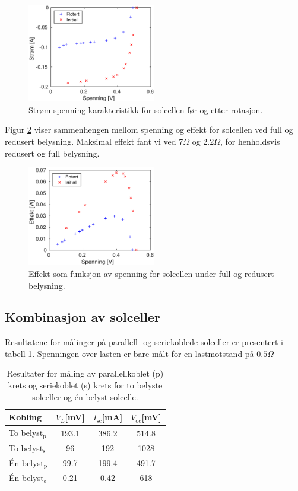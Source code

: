 \documentclass[a4paper,11pt, twocolumn]{article}
\begin{document}
\begin{figure}[!ht]
	\includegraphics[width = 0.5\textwidth]{matlab/LAB/currentVoltageRotated.eps}
	\caption{Strøm-spenning-karakteristikk for solcellen før og etter rotasjon.}
	\label{fig:currentVoltageRotation}
\end{figure}

Figur \ref{fig:effekt} viser sammenhengen mellom spenning og effekt for solcellen ved full og redusert belysning. Maksimal effekt fant vi ved 7$\Omega$ og 2.2$\Omega$, for henholdsvis redusert og full belysning.
\begin{figure}[!ht]
	\includegraphics[width = 0.5\textwidth]{matlab/LAB/optimalBelastning.eps}
	\caption{Effekt som funksjon av spenning for solcellen under full og redusert belysning.}
	\label{fig:effekt}
\end{figure}

\subsection{Kombinasjon av solceller}
Resultatene for målinger på parallell- og seriekoblede solceller er presentert i tabell \ref{tab:serieParallell}. Spenningen over lasten er bare målt for en lastmotstand på $0.5\Omega$

\begin{table}[!ht]
	\caption{Resultater for måling av parallellkoblet (p) krets og seriekoblet (s) krets for to belyste solceller og \'en belyst solcelle.}
	\label{tab:serieParallell}
	\begin{tabular}{lccc}
		\toprule
		\toprule
		Kobling & $V_L$[mV]  & $I_\text{sc}$[mA] & $V_\text{oc}$[mV]\\
		\hline
		To belyst$_\text{p}$ & 193.1  & 386.2 & 514.8\\
		To belyst$_\text{s}$ &  96  & 192 & 1028\\
		\'En belyst$_\text{p}$ &  99.7  & 199.4 & 491.7\\
		\'En belyst$_\text{s}$ &  0.21  & 0.42 & 618\\
		\toprule
	\end{tabular}
\end{table}
\end{document}
